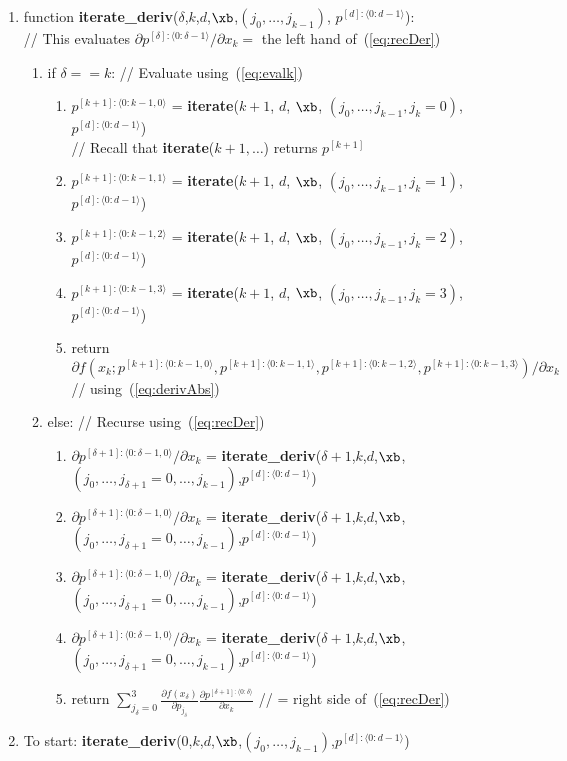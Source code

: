 \documentclass[11pt]{article}
\begin{document}
\begin{enumerate}
\item function \textbf{iterate\_deriv}($\delta$,$k$,$d$,$\xb$,$(j_0, \dots, j_{k-1})$, $p^{[d]:\langle 0:d-1 \rangle}$): \\
// This evaluates $\partial p^{[\delta]: \langle 0:\delta-1 \rangle} / \partial x_k = $ the left hand of~(\ref{eq:recDer})
\begin{enumerate}
\item if $\delta == k$: // Evaluate using~(\ref{eq:evalk})
\begin{enumerate}
\item $p^{[k+1]: \langle 0:k-1,0 \rangle}$ = \textbf{iterate}($k+1$, $d$, $\xb$, $(j_{0}, \dots, j_{k-1}, j_k=0)$, $p^{[d]:\langle 0:d-1 \rangle}$) \\
// Recall that \textbf{iterate}($k+1,\dots$) returns $p^{[k+1]}$
\item $p^{[k+1]: \langle 0:k-1,1 \rangle}$ = \textbf{iterate}($k+1$, $d$, $\xb$, $(j_{0}, \dots, j_{k-1}, j_k=1)$, $p^{[d]:\langle 0:d-1 \rangle}$)
\item $p^{[k+1]: \langle 0:k-1,2 \rangle}$ = \textbf{iterate}($k+1$, $d$, $\xb$, $(j_{0}, \dots, j_{k-1}, j_k=2)$, $p^{[d]:\langle 0:d-1 \rangle}$)
\item $p^{[k+1]: \langle 0:k-1,3 \rangle}$ = \textbf{iterate}($k+1$, $d$, $\xb$, $(j_{0}, \dots, j_{k-1}, j_k=3)$, $p^{[d]:\langle 0:d-1 \rangle}$)
\item return $\partial
f \left ( 
x_{k} ; 
p^{[k+1]: \langle 0:k-1,0 \rangle},
p^{[k+1]: \langle 0:k-1,1 \rangle},
p^{[k+1]: \langle 0:k-1,2 \rangle},
p^{[k+1]: \langle 0:k-1,3 \rangle}
\right ) 
/
\partial x_k
$ // using~(\ref{eq:derivAbs})
\end{enumerate}
\item else: // Recurse using~(\ref{eq:recDer})
\begin{enumerate}
\item $\partial p^{[\delta+1]: \langle 0:\delta-1,0 \rangle} / \partial x_k$ = \textbf{iterate\_deriv}($\delta+1$,$k$,$d$,$\xb$,$(j_0, \dots, j_{\delta+1} = 0,\dots, j_{k-1})$,$p^{[d]:\langle 0:d-1 \rangle}$)
\item $\partial p^{[\delta+1]: \langle 0:\delta-1,0 \rangle} / \partial x_k$ = \textbf{iterate\_deriv}($\delta+1$,$k$,$d$,$\xb$,$(j_0, \dots, j_{\delta+1} = 0,\dots, j_{k-1})$,$p^{[d]:\langle 0:d-1 \rangle}$)
\item $\partial p^{[\delta+1]: \langle 0:\delta-1,0 \rangle} / \partial x_k$ = \textbf{iterate\_deriv}($\delta+1$,$k$,$d$,$\xb$,$(j_0, \dots, j_{\delta+1} = 0,\dots, j_{k-1})$,$p^{[d]:\langle 0:d-1 \rangle}$)
\item $\partial p^{[\delta+1]: \langle 0:\delta-1,0 \rangle} / \partial x_k$ = \textbf{iterate\_deriv}($\delta+1$,$k$,$d$,$\xb$,$(j_0, \dots, j_{\delta+1} = 0,\dots, j_{k-1})$,$p^{[d]:\langle 0:d-1 \rangle}$)
\item return $
\sum_{j_\delta=0}^3 
\frac{
\partial f(x_\delta)
}{
\partial p_{j_\delta}
}
\frac{\partial p^{[\delta+1]: \langle 0:\delta \rangle}
}{
\partial x_k
}
$ // = right side of~(\ref{eq:recDer})
\end{enumerate}
\end{enumerate}

\item To start: \textbf{iterate\_deriv}($0$,$k$,$d$,$\xb$,$(j_0, \dots, j_{k-1})$,$p^{[d]:\langle 0:d-1 \rangle}$)
\end{enumerate}
\end{document}
